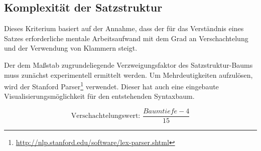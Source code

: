 \documentclass[10pt,a4paper]{article}
\begin{document}
	\subsection*{Komplexität der Satzstruktur}
	Dieses Kriterium basiert auf der Annahme, dass der für das Verständnis eines Satzes erforderliche mentale Arbeitsaufwand mit dem Grad an Verschachtelung und der Verwendung von Klammern steigt. 
	
	Der dem Maßstab zugrundeliegende Verzweigungsfaktor des Satzstruktur-Baums muss zunächst experimentell ermittelt werden. Um Mehrdeutigkeiten aufzulösen, wird der Stanford Parser\footnote{\url{http://nlp.stanford.edu/software/lex-parser.shtml}} verwendet. Dieser hat auch eine eingebaute Visualisierungsmöglichkeit für den entstehenden Syntaxbaum.
	
	\begin{equation*}
		\text{Verschachtelungswert: } \frac{Baumtiefe-4}{15}
	\end{equation*}
		
	
\end{document}

